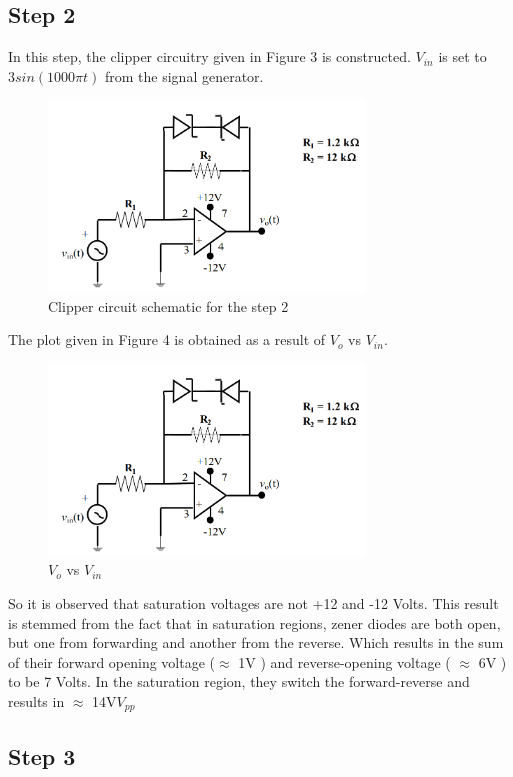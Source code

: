 \documentclass[letterpaper,12pt]{article}
\begin{document}
\subsection{Step 2}
In this step, the clipper circuitry given in Figure 3 is constructed. \(V_{in}\) is set to \(3 sin (1000\pi t)\) from the signal generator.
\begin{figure}[H]
    \centering
    \includegraphics[width = 0.75\textwidth]{2SCH.png}
    \caption{Clipper circuit schematic for the step 2}
\end{figure} 
The plot given in Figure 4 is obtained as a result of \(V_o\) vs \(V_{in}\).
\begin{figure}[H]
    \centering
    \includegraphics[width = 0.75\textwidth]{2SCH.png}
    \caption{\(V_o\) vs \(V_{in}\)}
\end{figure} 
So it is observed that saturation voltages are not +12 and -12 Volts. This result is stemmed from the fact that in saturation regions, zener diodes are both open, but one from forwarding and another from the reverse. Which results in the sum of their forward opening voltage (\(\approx\)  1V ) and reverse-opening voltage ( \( \approx \) 6V ) to be 7 Volts. In the saturation region, they switch the forward-reverse and results in \( \approx\) 14V\(V_{pp}\)

\subsection{Step 3}
\end{document}
